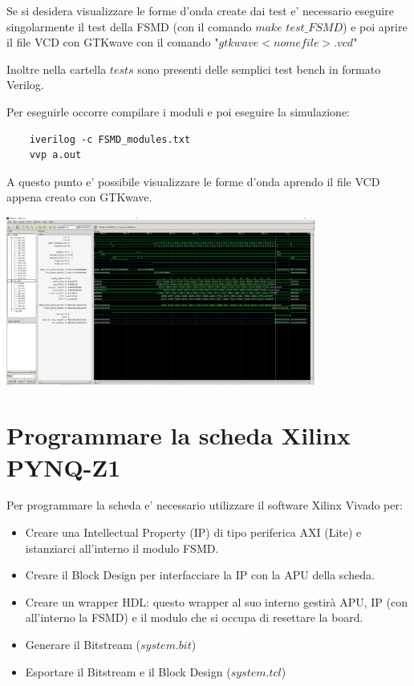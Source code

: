 \documentclass[a4paper]{article}
\begin{document}
Se si desidera visualizzare le forme d'onda create dai test e' necessario eseguire singolarmente il test della FSMD (con il comando $make$ $test\_FSMD$)
e poi aprire il file VCD con GTKwave con il comando "$gtkwave <nomefile>.vcd$"

Inoltre nella cartella $tests$ sono presenti delle semplici test bench in formato Verilog.

Per eseguirle occorre compilare i moduli e poi eseguire la simulazione:
\begin{verbatim}
    iverilog -c FSMD_modules.txt
    vvp a.out
\end{verbatim}

A questo punto e' possibile visualizzare le forme d'onda aprendo il file VCD appena creato con GTKwave.

\includegraphics[width=4in]{assets/fsmd_waves.png}

\section{Programmare la scheda Xilinx PYNQ-Z1}

Per programmare la scheda e' necessario utilizzare il software Xilinx Vivado per:
\begin{itemize}
    \item Creare una Intellectual Property (IP) di tipo periferica AXI (Lite) e istanziarci all'interno il modulo FSMD.
    
    \item Creare il Block Design per interfacciare la IP con la APU della scheda.
    
    \item Creare un wrapper HDL: questo wrapper al suo interno gestirà APU, IP (con all'interno la FSMD) e il modulo che si occupa di resettare la board.
    \item Generare il Bitstream ($system.bit$)
    \item Esportare il Bitstream e il Block Design ($system.tcl$)
\end{itemize}
\end{document}
